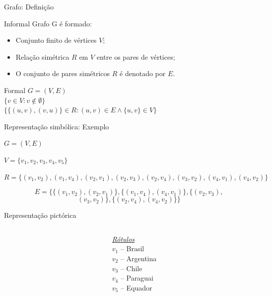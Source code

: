 \documentclass[handout]{beamer}
\begin{document}
\begin{frame}{Grafo: Definição}

\begin{block}{Informal}
Grafo G é formado:
\begin{itemize}
\item Conjunto finito de vértices $V$;
\item Relação simétrica $R$ em $V$ entre os pares de vértices;
\item O conjunto de pares simétricos $R$ é denotado por $E$.
\end{itemize}
\end{block}

\begin{block}{Formal}
$G = (V, E)$ \\
$\{v \in V : v \notin \emptyset\}$ \\
$\{ \{(u, v), (v, u)\} \in R : (u, v) \in E \land \{u, v\} \in V\}$ \\
\end{block}

\end{frame}

\begin{frame}{Representação simbólica: Exemplo}

$G = (V, E)$

$V = \{v_1, v_2, v_3, v_4, v_5\}$

$R = \{(v_1, v_2), (v_1, v_4), (v_2, v_1), (v_2, v_3), (v_2, v_4),
(v_3, v_2), (v_4, v_1), (v_4, v_2)\}$

$$ E = \{\{(v_1, v_2), (v_2, v_1)\}, \{(v_1, v_4), (v_4, v_1)\}, \{(v_2, v_3),$$  
$$(v_3, v_2)\}, \{(v_2, v_4), (v_4, v_2)\}\} $$

\end{frame}


\begin{frame}{Representação pictórica}

\begin{columns}
\begin{column}{0.6\textwidth}

\end{column}

\begin{column}{0.35\textwidth}
\scriptsize
\underline{\it Rótulos\/}\\
$v_1$ -- Brasil\\
$v_2$ -- Argentina\\
$v_3$ -- Chile \\
$v_4$ -- Paraguai \\
$v_5$ -- Equador
\end{column}

\end{columns}

\end{frame}
\end{document}
